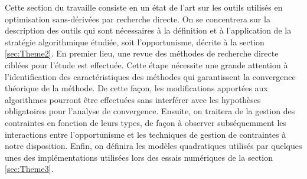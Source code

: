 \label{sec:Theme1}
Cette section du travaille consiste en un état de l'art sur les outils utilisés en optimisation sans-dérivées par recherche directe. On se concentrera sur la description des outils qui sont nécessaires à la définition et à l'application de la stratégie algorithmique étudiée, soit l'opportunisme, décrite à la section \ref{sec:Theme2}. En premier lieu, une revue des méthodes de recherche directe ciblées pour l'étude est effectuée. Cette étape nécessite une grande attention à l'identification des caractéristiques des méthodes qui garantissent la convergence théorique de la méthode. De cette façon, les modifications apportées aux algorithmes pourront être effectuées sans interférer avec les hypothèses obligatoires pour l'analyse de convergence. Ensuite, on traitera de la gestion des contraintes en fonction de leurs types, de façon à observer subséquemment les interactions entre l'opportunisme et les techniques de gestion de contraintes à notre disposition. Enfin, on définira les modèles quadratiques utilisés par quelques unes des implémentations utilisées lors des essais numériques de la section \ref{sec:Theme3}.
